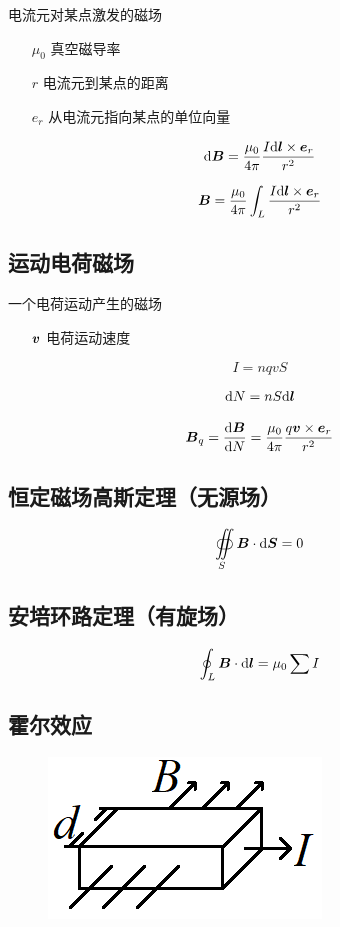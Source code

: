 \documentclass{article}
\begin{document}
电流元对某点激发的磁场

\begin{enumerate}
    \item [$\mu_0$] 真空磁导率
    \item [$r$] 电流元到某点的距离
    \item [$e_r$] 从电流元指向某点的单位向量
\end{enumerate}

\[\mathrm d\boldsymbol{B}=\frac{\mu_0}{4\pi}\frac{I\mathrm d\boldsymbol{l}\times\boldsymbol{e}_r}{r^2}\]

\[\boldsymbol{B}=\frac{\mu_0}{4\pi}\int_L\frac{I\mathrm d\boldsymbol{l}\times\boldsymbol{e}_r}{r^2}\]

\subsection{运动电荷磁场}

一个电荷运动产生的磁场

\begin{enumerate}
    \item [$\boldsymbol{v}$] 电荷运动速度
\end{enumerate}

\[I=nqvS\]

\[\mathrm d N=nS\mathrm d\boldsymbol{l}\]

\[\boldsymbol{B}_q=\frac{\mathrm d\boldsymbol{B}}{\mathrm d N}=\frac{\mu_0}{4\pi}\frac{q\boldsymbol{v}\times\boldsymbol{e}_r}{r^2}\]

\subsection{恒定磁场高斯定理（无源场）}

\[\oiint\limits_S\boldsymbol{B}\cdot\mathrm d\boldsymbol{S}=0\]

\subsection{安培环路定理（有旋场）}

\[\oint_L\boldsymbol{B}\cdot\mathrm d\boldsymbol{l}=\mu_0\sum I\]

\subsection{霍尔效应}

\begin{figure}[H]
    \centering
    \includegraphics[width=0.2\linewidth]{HallEffect.png}
\end{figure}
\end{document}
